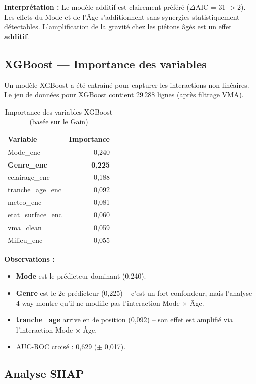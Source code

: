 \documentclass[12pt,a4paper]{article}
\begin{document}
\textbf{Interprétation :} Le modèle additif est clairement préféré
($\Delta$AIC = 31 $> 2$). Les effets du Mode et de l'\^Age s'additionnent
sans synergies statistiquement détectables. L'amplification de la gravité
chez les piétons \^{a}gés est un effet \textbf{additif}.

\subsection{XGBoost --- Importance des variables}

Un modèle XGBoost a été entraîné pour capturer les interactions non
linéaires. Le jeu de données pour XGBoost contient 29\,288 lignes
(après filtrage VMA).

\begin{table}[H]
\centering
\caption{Importance des variables XGBoost (basée sur le Gain)}
\label{tab:xgboost}
\begin{tabular}{@{}l r@{}}
\toprule
\textbf{Variable} & \textbf{Importance} \\
\midrule
Mode\_enc          & 0,240 \\
\textbf{Genre\_enc} & \textbf{0,225} \\
eclairage\_enc     & 0,188 \\
tranche\_age\_enc  & 0,092 \\
meteo\_enc         & 0,081 \\
etat\_surface\_enc & 0,060 \\
vma\_clean         & 0,059 \\
Milieu\_enc        & 0,055 \\
\bottomrule
\end{tabular}
\end{table}

\textbf{Observations :}
\begin{itemize}
  \item \textbf{Mode} est le prédicteur dominant (0,240).
  \item \textbf{Genre} est le 2e prédicteur (0,225) -- c'est un fort
        confondeur, mais l'analyse 4-way montre qu'il ne modifie pas
        l'interaction Mode $\times$ \^Age.
  \item \textbf{tranche\_age} arrive en 4e position (0,092) -- son effet
        est amplifié via l'interaction Mode $\times$ \^Age.
  \item AUC-ROC croisé : 0,629 ($\pm$ 0,017).
\end{itemize}

\subsection{Analyse SHAP}
\end{document}
